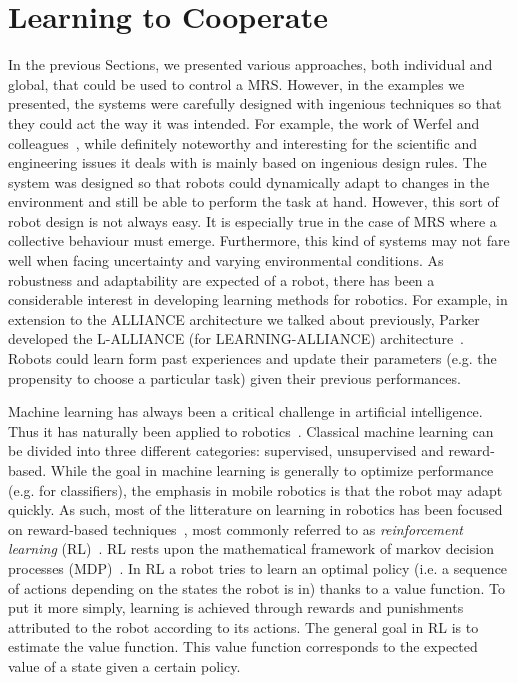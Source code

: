 \section{Learning to Cooperate}
\label{section:RL}

  In the previous Sections, we presented various approaches, both individual and global, that could be used to control a MRS. However, in the examples we presented, the systems were carefully designed with ingenious techniques so that they could act the way it was intended. For example, the work of Werfel and colleagues~\parencite{Werfel2014}, while definitely noteworthy and interesting for the scientific and engineering issues it deals with is mainly based on ingenious design rules. The system was designed so that robots could dynamically adapt to changes in the environment and still be able to perform the task at hand. However, this sort of robot design is not always easy. It is especially true in the case of MRS where a collective behaviour must emerge. Furthermore, this kind of systems may not fare well when facing uncertainty and varying environmental conditions. As robustness and adaptability are expected of a robot, there has been a considerable interest in developing learning methods for robotics. For example, in extension to the ALLIANCE architecture we talked about previously, Parker developed the L-ALLIANCE (for LEARNING-ALLIANCE) architecture~\parencite{Parker1994}. Robots could learn form past experiences and update their parameters (e.g. the propensity to choose a particular task) given their previous performances.

  Machine learning has always been a critical challenge in artificial intelligence. Thus it has naturally been applied to robotics~\parencite{Hertzberg2008}. Classical machine learning can be divided into three different categories: supervised, unsupervised and reward-based. While the goal in machine learning is generally to optimize performance (e.g. for classifiers), the emphasis in mobile robotics is that the robot may adapt quickly. As such, most of the litterature on learning in robotics has been focused on reward-based techniques~\parencite{Mataric2008}, most commonly referred to as \emph{reinforcement learning} (RL)~\parencite{Sutton1998}. RL rests upon the mathematical framework of markov decision processes (MDP)~\parencite{Bellman1957}. In RL a robot tries to learn an optimal policy (i.e. a sequence of actions depending on the states the robot is in) thanks to a value function. To put it more simply, learning is achieved through rewards and punishments attributed to the robot according to its actions. The general goal in RL is to estimate the value function. This value function corresponds to the expected value of a state given a certain policy.

